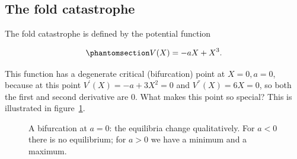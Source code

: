 \documentclass[
  a4paper,
  DIV=11,
  numbers=noendperiod,
  oneside]{scrreprt}
\begin{document}
\subsection{The fold catastrophe}\label{sec-The-fold-catastrophe}

The fold catastrophe is defined by the potential function

\begin{equation}\phantomsection\label{eq-ch3-3-old-7}{
V(X) = {- aX + X}^{3}.
}\end{equation}

This function has a degenerate critical (bifurcation) point at
\(X = 0, a = 0\), because at this point \(V^{'}(X) = - a + 3X^{2} = 0\)
and \(V^{''}(X) = 6X = 0\), so both the first and second derivative are
0. What makes this point so special? This is illustrated in
figure~\ref{fig-ch3-img4-old-16}.

\begin{figure}


\caption{\label{fig-ch3-img4-old-16}A bifurcation at \(a = 0\): the
equilibria change qualitatively. For \(a<0\) there is no equilibrium;
for \(a>0\) we have a minimum and a maximum.}

\end{figure}%
\end{document}
